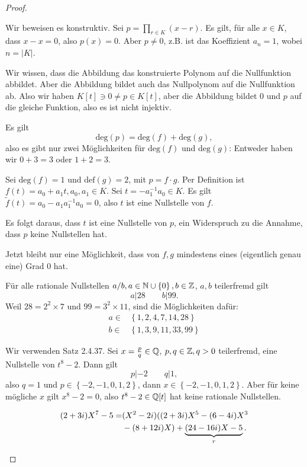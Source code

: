\begin{proof}
	\begin{parts}
	\item Wir beweisen es konstruktiv. Sei $p=\prod_{r\in K} (x-r)  $. Es gilt, f\"{u}r alle $x\in K$, dass $x-x=0$, also $p(x)=0$. Aber $p\neq 0$, z.B. ist das Koeffizient $a_n=1$, wobei $n=|K|$.

		Wir wissen, dass die Abbildung das konstruierte Polynom auf die Nullfunktion abbildet. Aber die Abbildung bildet auch das Nullpolynom auf die Nullfunktion ab. Also wir haben $K[t]\ni 0 \neq p\in K[t]$, aber die Abbildung bildet $0$ und $p$ auf die gleiche Funktion, also es ist nicht injektiv.
	\item Es gilt
		\[
			\text{deg}(p)=\text{deg}(f)+\text{deg}(g)
		,\]
		also es gibt nur zwei Möglichkeiten f\"{u}r $\text{deg}(f)$ und $\text{deg}(g)$: Entweder haben wir $0+3=3$ oder $1+2=3$. 

		Sei $ \text{deg}(f)=1$ und $\text{def}(g)=2$, mit $p=f\cdot g$. Per Definition ist $f(t)=a_0+a_1t,a_0,a_1\in K$. Sei $t=-a_1^{-1}a_0\in K$. Es gilt $\tilde{f}(t)=a_0-a_1a_1^{-1}a_0=0$, also $ t$ ist eine Nullstelle von $f$. 

		Es folgt daraus, dass $t$ ist eine Nullstelle von $p$, ein Widerspruch zu die Annahme, dass $p$ keine Nullstellen hat.

		Jetzt bleibt nur eine Möglichkeit, dass von $f,g$ mindestens eines (eigentlich genau eine) Grad $0$ hat.
	\item F\"{u}r alle rationale Nullstellen $a / b, a\in \mathbb{N}\cup \left\{ 0 \right\} , b\in \mathbb{Z}$, $a,b$ teilerfremd gilt 
		\[
		a|28\qquad b|99
		.\] 
		Weil $28=2^2\times 7$ und $99=3^2\times 11$, sind die Möglichkeiten dafür:
		\begin{align*}
			a\in& \left\{1,2,4,7,14, 28 \right\} \\
			b\in& \left\{ 1,3,9,11,33,99 \right\} 
		\end{align*}
	\item Wir verwenden Satz 2.4.37. Sei $x=\frac{p}{q}\in \mathbb{Q}$, $p,q\in \mathbb{Z}, q >0$ teilerfremd, eine Nullstelle von $t^8-2$. Dann gilt
		\[
		p|-2\qquad q|1
		,\] 
		also $q=1$ und $p\in\left\{ -2,-1,0,1,2 \right\} $, dann $x\in \left\{ -2,-1,0,1,2 \right\} $. Aber f\"{u}r keine mögliche $x$ gilt $x^8-2=0$, also $t^8-2\in \mathbb{Q}[t]$ hat keine rationale Nullstellen.
	\item 
		\begin{align*}
			(2+3i)X^7-5=&(X^2-2i)((2+3i)X^5-(6-4i)X^3\\&-(8+12i)X)+\underbrace{(24-16i)X-5}_r.\qedhere
		\end{align*}
	\end{parts}
\end{proof}

